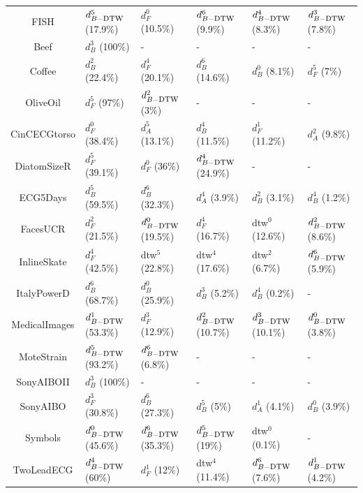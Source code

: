 \begin{table}[h!]
{\begin{tabular}{| c |  l l l l l |}
			\\
			FISH				& $d_{B-\mbox{\sc dtw}}^5$ (17.9\%)&   $d_F^0$ (10.5\%)&   $d_{B-\mbox{\sc dtw}}^6$ (9.9\%)&   $d_{B-\mbox{\sc dtw}}^4$ (8.3\%)&   $d_{B-\mbox{\sc dtw}}^3$ (7.8\%)  
			\\
			Beef				& $d_B^3$ (100\%)& - & - &-  & -  
			\\
			Coffee				& $d_B^2$ (22.4\%)&   $d_F^4$ (20.1\%)&   $d_B^6$ (14.6\%)&   $d_B^0$ (8.1\%)&   $d_F^5$ (7\%)   
			\\
			OliveOil			& $d_F^5$ (97\%)&   $d_{B-\mbox{\sc dtw}}^2$ (3\%)   & - & - & -
			\\
			CinCECGtorso		& $d_F^0$ (38.4\%)&   $d_A^5$ (13.1\%)&   $d_B^4$ (11.5\%)&   $d_F^1$ (11.2\%)&   $d_A^2$ (9.8\%)   
			\\
			DiatomSizeR 		& $d_F^5$ (39.1\%)&   $d_F^0$ (36\%)&   $d_{B-\mbox{\sc dtw}}^4$ (24.9\%)  & - & - 
			\\
			ECG5Days			& $d_B^5$ (59.5\%)&   $d_B^6$ (32.3\%)&   $d_A^4$ (3.9\%)&   $d_B^2$ (3.1\%)&   $d_B^4$ (1.2\%)  
			\\
			FacesUCR			& $d_F^2$ (21.5\%)&   $d_{B-\mbox{\sc dtw}}^0$ (19.5\%)&   $d_F^4$ (16.7\%)&   {\sc dtw}$^0$ (12.6\%)&   $d_{B-\mbox{\sc dtw}}^2$ (8.6\%)
			\\
			InlineSkate			& $d_F^4$ (42.5\%)&   {\sc dtw}$^5$ (22.8\%)&   {\sc dtw}$^4$ (17.6\%)&   {\sc dtw}$^2$ (6.7\%)&   $d_{B-\mbox{\sc dtw}}^6$ (5.9\%)   
			\\
			ItalyPowerD 		& $d_B^6$ (68.7\%)&   $d_B^0$ (25.9\%)&   $d_B^3$ (5.2\%)&   $d_B^4$ (0.2\%)   & -
			\\
			MedicalImages		& $d_{B-\mbox{\sc dtw}}^1$ (53.3\%)&   $d_F^3$ (12.9\%)&   $d_{B-\mbox{\sc dtw}}^2$ (10.7\%)&   $d_{B-\mbox{\sc dtw}}^3$ (10.1\%)&   $d_{B-\mbox{\sc dtw}}^0$ (3.8\%)   
			\\
			MoteStrain			& $d_{B-\mbox{\sc dtw}}^5$ (93.2\%)&   $d_{B-\mbox{\sc dtw}}^6$ (6.8\%)& -  & - & -
			\\
			SonyAIBOII			& $d_B^3$ (100\%)& -   & - & - &- 
			\\
			SonyAIBO			& $d_F^3$ (30.8\%)&   $d_B^6$ (27.3\%)&   $d_B^5$ (5\%)&   $d_A^1$ (4.1\%)&   $d_B^0$ (3.9\%)   
			\\
			Symbols 			& $d_{B-\mbox{\sc dtw}}^0$ (45.6\%)&   $d_{B-\mbox{\sc dtw}}^6$ (35.3\%)&   $d_{B-\mbox{\sc dtw}}^5$ (19\%)&   {\sc dtw}$^0$ (0.1\%)   & -
			\\
			TwoLeadECG 			& $d_{B-\mbox{\sc dtw}}^4$ (60\%)&   $d_F^1$ (12\%)&   {\sc dtw}$^4$ (11.4\%)&   $d_{B-\mbox{\sc dtw}}^6$ (7.6\%)&   $d_{B-\mbox{\sc dtw}}^1$ (4.2\%)

\end{tabular}}
\end{table}
